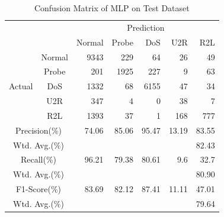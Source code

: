 \begin{table}[t]
    \caption{Confusion Matrix of MLP on Test Dataset}
    \centering
    \begin{tabular}{cc|rrrrr}
        \hline
        &  & \multicolumn{5}{c}{Prediction} \\
                        &        & Normal & Probe & DoS & U2R & R2L\\
        \hline
        \hline
        \multirow{5}{*}{Actual} & Normal & 9343 &  229 &   64 &  26 &  49 \\
                                &  Probe &  201 & 1925 &  227 &   9 &  63 \\
                                &  DoS   & 1332 &   68 & 6155 &  47 &  34 \\
                                &  U2R   &  347 &    4 &    0 &  38 &   7 \\
                                &  R2L   & 1393 &   37 &    1 & 168 & 777 \\
        \hline
        \multicolumn{2}{c|}{Precision(\%)}   & 74.06 & 85.06 & 95.47 & 13.19 & 83.55\\
        \multicolumn{2}{c|}{Wtd. Avg.(\%)}   & \multicolumn{5}{r}{82.43}\\
        \hline
        \multicolumn{2}{c|}{Recall(\%)}      & 96.21 & 79.38 & 80.61 &  9.6  & 32.7\\
        \multicolumn{2}{c|}{Wtd. Avg.(\%)}   & \multicolumn{5}{r}{80.90}\\
        \hline
        \multicolumn{2}{c|}{F1-Score(\%)}    & 83.69 & 82.12 & 87.41 & 11.11 & 47.01\\
        \multicolumn{2}{c|}{Wtd. Avg.(\%)}   & \multicolumn{5}{r}{\color{red}79.64}\\
        \hline
    \end{tabular}
    \label{Tab:ConfusionMatrixMLP}
\end{table}


